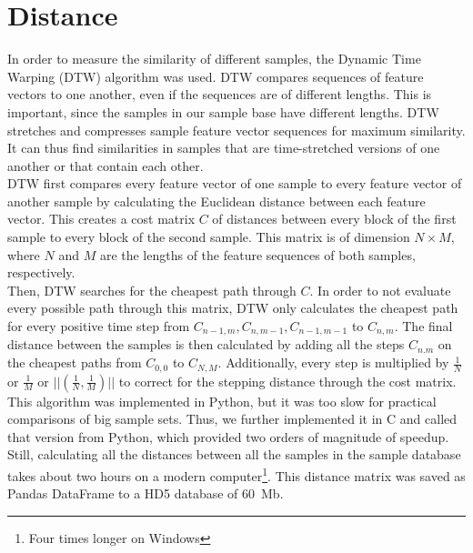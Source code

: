 \section{Distance}
\label{sec:Distance}
In order to measure the similarity of different samples, the Dynamic Time Warping (DTW) algorithm was used. DTW compares sequences of feature vectors to one another, even if the sequences are of different lengths. This is important, since the samples in our sample base have different lengths. DTW stretches and compresses sample feature vector sequences for maximum similarity. It can thus find similarities in samples that are time-stretched versions of one another or that contain each other.\\
DTW first compares every feature vector of one sample to every feature vector of another sample by calculating the Euclidean distance between each feature vector. This creates a cost matrix $C$ of distances between every block of the first sample to every block of the second sample. This matrix is of dimension $N \times M$, where $N$ and $M$ are the lengths of the feature sequences of both samples, respectively.\\
Then, DTW searches for the cheapest path through $C$. In order to not evaluate every possible path through this matrix, DTW only calculates the cheapest path for every positive time step from $C_{n-1,m}, C_{n,m-1}, C_{n-1,m-1}$ to $C_{n,m}$. The final distance between the samples is then calculated by adding all the steps $C_{n.m}$ on the cheapest paths from $C_{0,0}$ to $C_{N,M}$. Additionally, every step is multiplied by $\frac{1}{N}$ or $\frac{1}{M}$ or $||(\frac{1}{N},\frac{1}{M})||$ to correct for the stepping distance through the cost matrix.\\
This algorithm was implemented in Python, but it was too slow for practical comparisons of big sample sets. Thus, we further implemented it in C and called that version from Python, which provided two orders of magnitude of speedup. Still, calculating all the distances between all the samples in the sample database takes about two hours on a modern computer\footnote{Four times longer on Windows}. This distance matrix was saved as Pandas DataFrame to a HD5 database of 60~Mb.